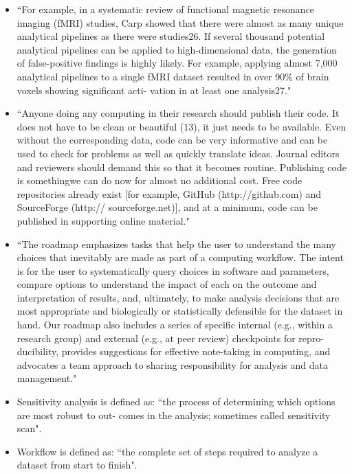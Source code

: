 \documentclass[pdftex,english,11pt,parskip=half]{scrartcl}
\begin{document}
\begin{itemize}
\item ``For example, in a systematic review of functional magnetic resonance imaging (fMRI) studies, Carp showed that there were almost as many unique analytical pipelines as there were studies26. If several thousand potential analytical pipelines can be applied to high-dimensional data, the generation of false-positive findings is highly likely. For example, applying almost 7,000 analytical pipelines to a single fMRI dataset resulted in over 90\% of brain voxels showing significant acti- vation in at least one analysis27." \cite{munafo2017manifesto}
\item ``Anyone doing any computing in their research
should publish their code. It does not have to be
clean or beautiful (13), it just needs to be available.
Even without the corresponding data, code
can be very informative and can be used to check
for problems as well as quickly translate ideas. Journal
editors and reviewers should demand this so
that it becomes routine. Publishing code is somethingwe
can do now for almost no additional cost.
Free code repositories already exist [for example,
GitHub (http://github.com) and SourceForge (http://
sourceforge.net)], and at a minimum, code can be
published in supporting online material." \cite{peng2011reproducible}
\item ``The roadmap emphasizes tasks that help the user to understand the many choices that inevitably are made as part of a computing workflow. The intent is for the user to systematically query choices in software and parameters, compare options to understand the impact of each on the outcome and interpretation of results, and, ultimately, to make analysis decisions that are most appropriate and biologically or statistically defensible for the dataset in hand. Our roadmap also includes a series of specific internal (e.g., within a research group) and external (e.g., at peer review) checkpoints for repro- ducibility, provides suggestions for effective note-taking in computing, and advocates a team approach to sharing responsibility for analysis and data management." \cite{shade2015computing}
\item Sensitivity analysis is defined as: ``the process of determining which options are most robust to out-
comes in the analysis; sometimes called sensitivity scan". \cite{shade2015computing}
\item Workflow is defined as: ``the complete set of steps required to analyze a dataset from start to finish". \cite{shade2015computing}

\end{itemize}
\end{document}
